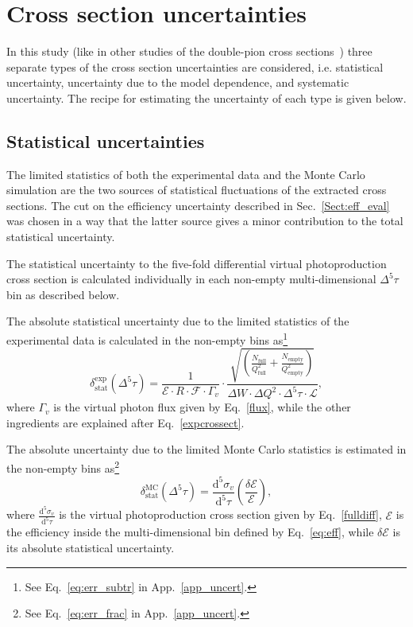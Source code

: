 \chapter{Cross section uncertainties}
\label{Sect:uncert}

In this study (like in other studies of the double-pion cross sections~\cite{Rip_an_note:2002,Ripani:2002ss,Fed_an_note:2007,Fedotov:2008aa,Isupov:2017lnd,Arjun,Fed_an_note:2017,Fed_paper_2018}) three separate types of the cross section uncertainties are considered, i.e. statistical uncertainty, uncertainty due to the model dependence, and systematic uncertainty. The recipe for estimating the uncertainty of each type is given below. 


\section{Statistical uncertainties}
\label{Sect:stat_uncert}


The limited statistics of both the experimental data and the Monte Carlo simulation are the two sources of statistical fluctuations of the extracted 
cross sections. The cut on the efficiency uncertainty described in Sec.~\ref{Sect:eff_eval} was chosen in a way that the latter source gives a minor contribution to the total statistical uncertainty.

The statistical uncertainty to the five-fold differential virtual photoproduction cross section is calculated individually in each non-empty multi-dimensional $\Delta^{5}\tau$ bin as described below.

The absolute statistical  uncertainty due to the limited statistics of the experimental data is calculated in the non-empty bins as\footnote[1]{See Eq.~\eqref{eq:err_subtr} in App.~\ref{app_uncert}.}
\begin{equation}
\delta_{\text{stat}}^{\text{exp}}(\Delta^{5} \tau) = \frac{1}{\mathcal{E} \! \cdot \! R \! \cdot \! \mathcal{F} \! \cdot \! \Gamma_{v} }  \cdot  \frac{\sqrt{\left( \frac{N_{\text{full}}}{Q_{\text{full}}^{2}}+\frac{N_{\text{empty}}}{Q_{\text{empty}}^{2}} \right) } }{
\Delta W \! \cdot \!  \Delta Q^{2} \! \cdot \!  \Delta^{5} \tau \! \cdot \! \mathcal{L}},
\label{staterrors}
\end{equation}
where $\Gamma_{v}$ is the virtual photon flux given by Eq.~\eqref{flux}, while the other ingredients are explained after Eq.~\eqref{expcrossect}.


The absolute uncertainty due to the limited Monte Carlo statistics is estimated in the non-empty bins as\footnote[2]{See Eq.~\eqref{eq:err_frac} in App.~\ref{app_uncert}.}
\begin{equation}
\delta_{\text{stat}}^{\text{MC}}(\Delta^{5} \tau) = \frac{\textrm{d}^{5}\sigma_{v}}{\textrm{d}^{5}\tau} \left( \frac{\delta \mathcal{E}}{\mathcal{E}} \right),
\label{montecarloerror}
\end{equation}
where $\frac{\textrm{d}^{5}\sigma_{v}}{\textrm{d}^{5}\tau}$ is the virtual photoproduction cross section given by Eq.~\eqref{fulldiff}, $\mathcal{E}$ is the efficiency inside the multi-dimensional bin defined by Eq.~\eqref{eq:eff}, while $\delta \mathcal{E}$ is its absolute statistical uncertainty. 

